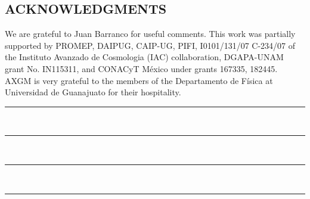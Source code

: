 \documentclass[8pt,letterpaper,twocolumn]{article}
\begin{document}
\begin{multicols}{2}
\section*{ACKNOWLEDGMENTS}
\vspace{3mm}
We are grateful to Juan Barranco for useful comments. This work was partially supported by PROMEP, DAIPUG, CAIP-UG, PIFI, I0101/131/07 C-234/07 of the Instituto Avanzado de Cosmologia (IAC) collaboration, DGAPA-UNAM grant No. IN115311, and CONACyT México under grants 167335, 182445. AXGM is very grateful to the members of the Departamento de Física at Universidad de Guanajuato for their hospitality.


\end{multicols}
\onecolumn
\centering
\rule{0.2\textwidth}{1pt}\\
\vspace{-1.22em}
\rule{0.3\textwidth}{0.7pt}\\
\vspace{-1.23em}
\rule{0.5\textwidth}{0.5pt}\\
\vspace{-1.2em}
\rule{0.65\textwidth}{0.2pt}
\begin{multicols}{2}




\end{multicols}
\end{document}
